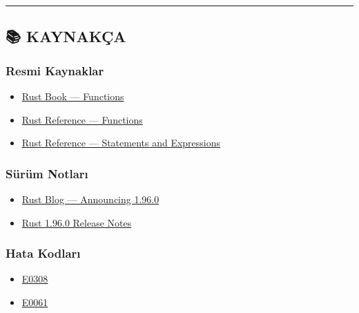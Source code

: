 \documentclass[12pt,a4paper]{article}
\begin{document}
\begin{center}\rule{0.5\linewidth}{0.5pt}\end{center}

\subsection{📚 KAYNAKÇA}\label{kaynakça-9}

\subsubsection{Resmi Kaynaklar}\label{resmi-kaynaklar-9}

\begin{itemize}
\tightlist
\item
  \href{https://doc.rust-lang.org/book/ch03-03-how-functions-work.html}{Rust Book --- Functions}
\item
  \href{https://doc.rust-lang.org/reference/items/functions.html}{Rust Reference --- Functions}
\item
  \href{https://doc.rust-lang.org/reference/statements-and-expressions.html}{Rust Reference --- Statements and Expressions}
\end{itemize}

\subsubsection{Sürüm Notları}\label{sürüm-notları-9}

\begin{itemize}
\tightlist
\item
  \href{https://blog.rust-lang.org/2026/05/28/Rust-1.96.0/}{Rust Blog --- Announcing 1.96.0}
\item
  \href{https://doc.rust-lang.org/stable/releases.html\#version-1960-2026-05-28}{Rust 1.96.0 Release Notes}
\end{itemize}

\subsubsection{Hata Kodları}\label{hata-kodları-9}

\begin{itemize}
\tightlist
\item
  \href{https://doc.rust-lang.org/error_codes/E0308.html}{E0308}
\item
  \href{https://doc.rust-lang.org/error_codes/E0061.html}{E0061}
\end{itemize}
\end{document}
